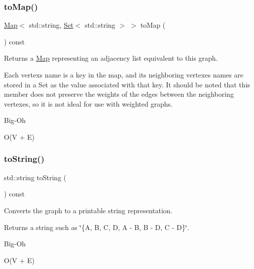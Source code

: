\subsubsection{\texorpdfstring{to\+Map()}{toMap()}}
{\footnotesize\ttfamily \mbox{\hyperlink{classMap}{Map}}$<$ std\+::string, \mbox{\hyperlink{classstanfordcpplib_1_1collections_1_1GenericSet}{Set}}$<$ std\+::string $>$ $>$ to\+Map (\begin{DoxyParamCaption}{ }\end{DoxyParamCaption}) const}



Returns a \mbox{\hyperlink{classMap}{Map}} representing an adjacency list equivalent to this graph. 

Each vertex\textquotesingle{}s name is a key in the map, and its neighboring vertexes\textquotesingle{} names are stored in a Set as the value associated with that key. It should be noted that this member does not preserve the weights of the edges between the neighboring vertexes, so it is not ideal for use with weighted graphs. \begin{DoxyRefDesc}{Big-\/\+Oh}
\item[\mbox{\hyperlink{BigOh__BigOh000036}{Big-\/\+Oh}}]O(V + E) \end{DoxyRefDesc}
\mbox{\label{classGraph_a1fe5121d6528fdea3f243321b3fa3a49}} 
\subsubsection{\texorpdfstring{to\+String()}{toString()}}
{\footnotesize\ttfamily std\+::string to\+String (\begin{DoxyParamCaption}{ }\end{DoxyParamCaption}) const\hspace{0.3cm}{\ttfamily [inherited]}}



Converts the graph to a printable string representation. 

\begin{DoxyReturn}{Returns}
a string such as {\ttfamily \char`\"{}\{\+A, B, C, D, A -\/ B, B -\/ D, C -\/ D\}\char`\"{}}. 
\end{DoxyReturn}
\begin{DoxyRefDesc}{Big-\/\+Oh}
\item[\mbox{\hyperlink{BigOh__BigOh000090}{Big-\/\+Oh}}]O(V + E) \end{DoxyRefDesc}
\mbox{\label{classBasicGraphGen_a68eb4830a4800ed7704895c16a8982be}} 
